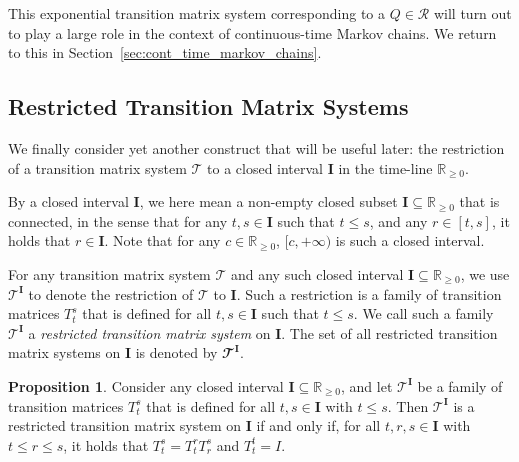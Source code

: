 \documentclass[10pt,a4paper]{paper}
\theoremstyle{definition}
\newtheorem{proposition}[theorem]{Proposition}
\newcommand{\reals}{\mathbb{R}}
\newcommand{\realsnonneg}{\reals_{\geq 0}}
\newcommand{\coloneqq}{:\!=}
\begin{document}
This exponential transition matrix system corresponding to a $Q\in\mathcal{R}$ will turn out to play a large role in the context of continuous-time Markov chains. We return to this in Section~\ref{sec:cont_time_markov_chains}.

\subsection{Restricted Transition Matrix Systems}\label{sec:restricted}

We finally consider yet another construct that will be useful later: the restriction of a transition matrix system $\mathcal{T}$ to a closed interval $\mathbf{I}$ in the time-line $\realsnonneg$.

By a closed interval $\mathbf{I}$, we here mean a non-empty closed subset $\mathbf{I}\subseteq\realsnonneg$ that is connected, in the sense that for any $t,s\in\mathbf{I}$ such that $t\leq s$, and any $r\in[t,s]$, it holds that $r\in\mathbf{I}$. Note that for any $c\in\realsnonneg$, $[c,+\infty)$ is such a closed interval.

For any transition matrix system $\mathcal{T}$ and any such closed interval $\mathbf{I}\subseteq\realsnonneg$, we use $\mathcal{T}^\mathbf{I}$ to denote the restriction of $\mathcal{T}$ to $\mathbf{I}$. Such a restriction is a family of transition matrices $T_t^s$ that is defined for all $t,s\in\mathbf{I}$ such that $t\leq s$.
We call such a family $\mathcal{T}^{\mathbf{I}}$ a \emph{restricted transition matrix system} on $\mathbf{I}$. The set of all restricted transition matrix systems on $\mathbf{I}$ is denoted by $\mathbfcal{T}^{\mathbf{I}}$.


\begin{proposition}\label{prop:restr_trans_mat_system_if_semigroup}
Consider any closed interval $\mathbf{I}\subseteq\realsnonneg$, and let $\mathcal{T}^{\mathbf{I}}$ be a family of transition matrices $T_t^s$ that is defined for all $t,s\in\mathbf{I}$ with $t\leq s$. Then $\mathcal{T}^{\mathbf{I}}$ is a restricted transition matrix system on $\mathbf{I}$ if and only if, for all $t,r,s\in\mathbf{I}$ with $t\leq r\leq s$, it holds that $T_t^s = T_t^rT_r^s$ and $T_t^t=I$.
\end{proposition}
\end{document}
